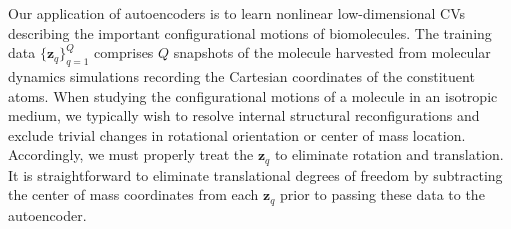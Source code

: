 \documentclass[12pt]{article}
\newcommand*{\blauw}[1]{#1}
\begin{document}
Our application of autoencoders is to learn nonlinear low-dimensional CVs describing the important configurational motions of biomolecules. The training data $\{\mathbf{z}_q\}_{q=1}^Q$ comprises $Q$ snapshots of the molecule harvested from molecular dynamics simulations recording the Cartesian coordinates of the constituent atoms. When studying the configurational motions of a molecule in an isotropic medium, we typically wish to resolve internal structural reconfigurations and exclude trivial changes in rotational orientation or center of mass location.  Accordingly, we must properly treat the $\mathbf{z}_q$ to eliminate rotation and translation. It is straightforward to eliminate translational degrees of freedom by subtracting the center of mass coordinates from each $\mathbf{z}_q$ prior to passing these data to the autoencoder. 
\end{document}
